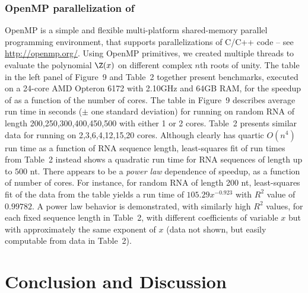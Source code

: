 \subsubsection*{OpenMP parallelization of \fftbor}

OpenMP is a simple and flexible
multi-platform shared-memory parallel programming environment, that supports
parallelizations of C/C++ code -- see \url{http://openmp.org/}.
Using OpenMP primitives, we created multiple threads to evaluate the polynomial
$\Z(x)$ on different complex $n$th roots of unity. The table in the left
panel of Figure~9
and Table~2 together present benchmarks,
executed on
a 24-core AMD Opteron 6172 with 2.10GHz and 64GB RAM, for the speedup
of \fftbor as a function of the number of cores.
The table in Figure~9 describes average
run time in seconds ($\pm$ one standard deviation) for running \fftbor
on random RNA of length 200,250,300,400,450,500 with either 1 or 2 cores.
Table~2 presents similar data for running
\fftbor on 2,3,6,4,12,15,20 cores.
Although \fftbor clearly has quartic $O(n^4)$ run time as a function of
RNA sequence length, least-squares fit
of run times from
Table~2 instead
shows a quadratic
run time for RNA sequences of length up to $500$ nt. There appears to be
a {\em power law} dependence of \fftbor
speedup, as a function of number of cores. For instance, for random RNA of
length 200 nt, least-squares fit of the data from the table yields
a run time of $105.29 x^{-0.923}$ with  $R^2$ value of
$0.99782$. A power law behavior is demonstrated, with similarly high
$R^2$ values, for each fixed sequence length in
Table~2, with different
coefficients of variable $x$ but with approximately the
same exponent of $x$ (data not shown, but easily computable from data in
Table~2).

\section*{Conclusion and Discussion}

